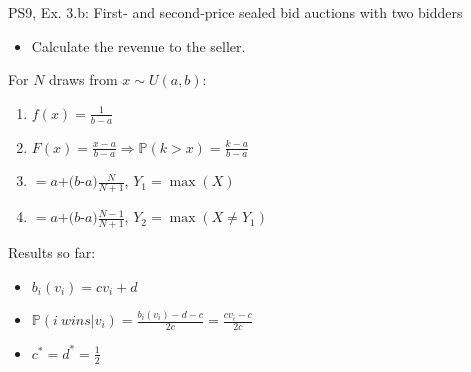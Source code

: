 \begin{frame}{PS9, Ex. 3.b: First- and second-price sealed bid auctions with two bidders}
    \begin{multicols}{2}
      \begin{itemize}
        \item[(b)] Calculate the revenue to the seller.
      \end{itemize}
      \vfill\null\columnbreak
      For $N$ draws from $x\sim U(a, b):$
      \vspace{-6pt}
      \begin{enumerate}
        \item[PDF:] $f(x)=\frac{1}{b-a}$
        \item[CDF:] $F(x)=\frac{x-a}{b-a}\Rightarrow\mathbb{P}(k>x)=\frac{k-a}{b-a}$
        \item[$\mathbb{E}(Y_1)$] $=a$+$(b$-$a)\frac{N}{N+1}$, $Y_1=\max(X)$
        \item[$\mathbb{E}(Y_2)$] $=a$+$(b$-$a)\frac{N-1}{N+1}$, $Y_2=\max(X\neq Y_1)$
      \end{enumerate}
      \vspace{-6pt}
      Results so far:
      \vspace{-6pt}
      \begin{itemize}
        \item[($*$)]  $b_i(v_i) = cv_i+d$
        \item[($**$)] $\mathbb{P}(i\ wins|v_i)=\frac{b_i(v_i)-d-c}{2c}=\frac{cv_i-c}{2c}$
        \item[(3.a)]    $c^*=d^*=\frac{1}{2}$
      \end{itemize}
      \vfill\null
    \end{multicols}
\end{frame}
